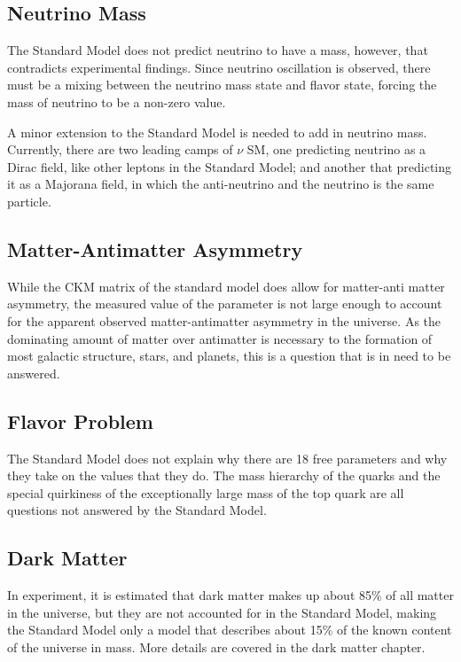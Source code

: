 \subsection{Neutrino Mass}
The Standard Model does not predict neutrino to have a mass, however, that contradicts experimental findings. Since neutrino oscillation is observed, there must be a mixing between the neutrino mass state and flavor state, forcing the mass of neutrino to be a non-zero value. 

A minor extension to the Standard Model is needed to add in neutrino mass. Currently, there are two leading camps of $\nu$ SM, one predicting neutrino as a Dirac field, like other leptons in the Standard Model; and another that predicting it as a Majorana field, in which the anti-neutrino and the neutrino is the same particle. 



\subsection{Matter-Antimatter Asymmetry}
While the CKM matrix of the standard model does allow for matter-anti matter asymmetry, the measured value of the parameter is not large enough to account for the apparent observed matter-antimatter asymmetry in the universe. As the dominating amount of matter over antimatter is necessary to the formation of most galactic structure, stars, and planets, this is a question that is in need to be answered.

\subsection{Flavor Problem}
The Standard Model does not explain why there are 18 free parameters and why they take on the values that they do. The mass hierarchy of the quarks and the special quirkiness of the exceptionally large mass of the top quark are all questions not answered by the Standard Model. 

\subsection{Dark Matter}
In experiment, it is estimated that dark matter makes up about 85\% of all matter in the universe, but they are not accounted for in the Standard Model, making the Standard Model only a model that describes about 15\% of the known content of the universe in mass. More details are covered in the dark matter chapter. 

